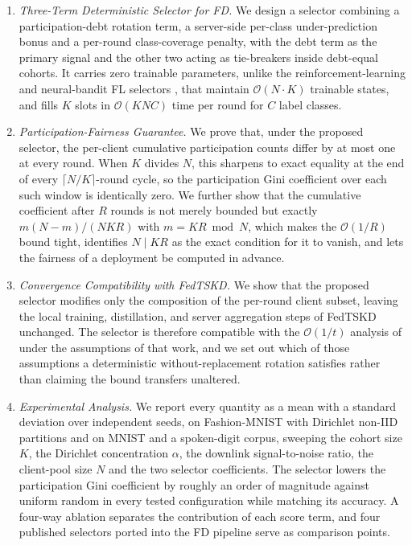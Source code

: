 \documentclass[journal]{IEEEtran}
\newcommand{\rev}[1]{#1}
\begin{document}
\begin{enumerate}
    \item \textit{Three-Term Deterministic Selector for FD.} We design a selector combining a participation-debt rotation term, a server-side per-class under-prediction bonus and a per-round class-coverage penalty, with the debt term as the primary signal and the other two acting as tie-breakers inside debt-equal cohorts. It carries zero trainable parameters, unlike the reinforcement-learning and neural-bandit FL selectors \rev{\cite{kazemi2026robust}, \cite{xia2020mab}} that maintain $\mathcal{O}(N\cdot K)$ trainable states, and fills $K$ slots in $\mathcal{O}(KNC)$ time per round for $C$ label classes.

    \item \textit{Participation-Fairness Guarantee.} We prove that, under the proposed selector, the per-client cumulative participation counts differ by at most one at every round. When $K$ divides $N$, this sharpens to exact equality at the end of every $\lceil N/K \rceil$-round cycle, so the participation Gini coefficient over each such window is identically zero. \rev{We further show that the cumulative coefficient after $R$ rounds is not merely bounded but exactly $m(N-m)/(NKR)$ with $m = KR \bmod N$, which makes the $\mathcal{O}(1/R)$ bound tight, identifies $N \mid KR$ as the exact condition for it to vanish, and lets the fairness of a deployment be computed in advance.}

    \item \textit{Convergence Compatibility with FedTSKD.} We show that the proposed selector modifies only the composition of the per-round client subset, leaving the local training, distillation, and server aggregation steps of FedTSKD \cite{mu2024fedtskd} unchanged. \rev{The selector is therefore compatible with the $\mathcal{O}(1/t)$ analysis of \cite{mu2024fedtskd} under the assumptions of that work, and we set out which of those assumptions a deterministic without-replacement rotation satisfies rather than claiming the bound transfers unaltered.}

    \item \textit{Experimental Analysis.} \rev{We report every quantity as a mean with a standard deviation over independent seeds, on Fashion-MNIST with Dirichlet non-IID partitions and on MNIST and a spoken-digit corpus, sweeping the cohort size $K$, the Dirichlet concentration $\alpha$, the downlink signal-to-noise ratio, the client-pool size $N$ and the two selector coefficients. The selector lowers the participation Gini coefficient by roughly an order of magnitude against uniform random in every tested configuration while matching its accuracy. A four-way ablation separates the contribution of each score term, and four published selectors ported into the FD pipeline serve as comparison points.}
\end{enumerate}
\end{document}
